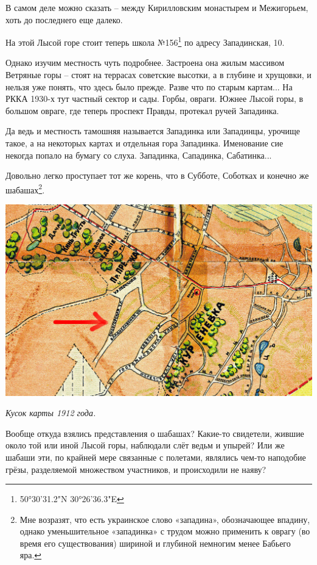 В самом деле можно сказать – между Кирилловским монастырем и Межигорьем, хоть до последнего еще далеко.

На этой Лысой горе стоит теперь школа №156\footnote{50°30'31.2"N 30°26'36.3"E} по адресу Западинская, 10.

Однако изучим местность чуть подробнее. Застроена она жилым массивом Ветряные горы – стоят на террасах советские высотки, а в глубине и хрущовки, и нельзя уже понять, что здесь было прежде. Разве что по старым картам... На РККА 1930-х тут частный сектор и сады. Горбы, овраги. Южнее Лысой горы, в большом овраге, где теперь проспект Правды, протекал ручей Западинка.

Да ведь и местность тамошняя называется Западинка или Западинцы, урочище такое, а на некоторых картах и отдельная гора Западинка. Именование сие некогда попало на бумагу со слуха. Западинка, Сападинка, Сабатинка...

Довольно легко проступает тот же корень, что в Субботе, Соботках и конечно же шабашах\footnote{Мне возразят, что есть украинское слово «западина», обозначающее впадину, однако уменьшительное «западинка» с трудом можно применить к оврагу (во время его существования) шириной и глубиной немногим менее Бабьего яра.}.

\begin{center}
\includegraphics[width=\textwidth]{chast-lys-gory/vvedenie/1912-lys.jpg}

\textit{Кусок карты 1912 года.}
\end{center}

Вообще откуда взялись представления о шабашах? Какие-то свидетели, жившие около той или иной Лысой горы, наблюдали слёт ведьм и упырей? Или же шабаши эти, по крайней мере связанные с полетами, являлись чем-то наподобие грёзы, разделяемой множеством участников, и происходили не наяву?

